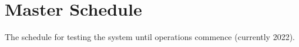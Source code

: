 
\section{Master Schedule}

The schedule for testing the system until operations commence (currently 2022). 


